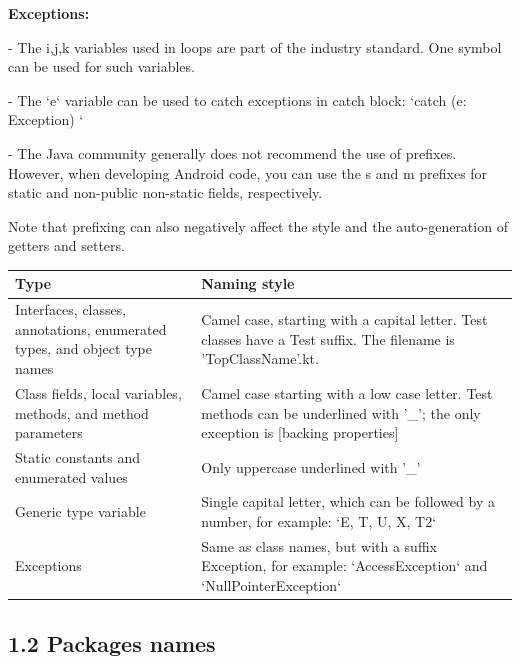 \textbf{Exceptions:}

- The i,j,k variables used in loops are part of the industry standard. One symbol can be used for such variables.

- The `e` variable can be used to catch exceptions in catch block: `catch (e: Exception) {}`

- The Java community generally does not recommend the use of prefixes. However, when developing Android code, you can use the s and m prefixes for static and non-public non-static fields, respectively.

Note that prefixing can also negatively affect the style and the auto-generation of getters and setters.



\begin{center}

\begin{tabular}{ |p{}|p{}| }

\hline

Type&Naming style\\

\hline

 Interfaces, classes, annotations, enumerated types, and object type names & Camel case, starting with a capital letter. Test classes have a Test suffix. The filename is 'TopClassName'.kt.  \\

 Class fields, local variables, methods, and method parameters & Camel case starting with a low case letter. Test methods can be underlined with '\_'; the only exception is [backing properties]\\

 Static constants and enumerated values & Only uppercase underlined with '\_' \\

 Generic type variable & Single capital letter, which can be followed by a number, for example: `E, T, U, X, T2` \\

 Exceptions & Same as class names, but with a suffix Exception, for example: `AccessException` and `NullPointerException`\\

\hline

\end{tabular}

\end{center}

\subsection*{\textbf{1.2 Packages names}}



